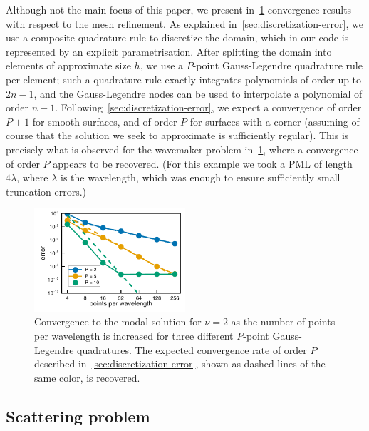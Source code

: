 \documentclass[review,hidelinks,onefignum,onetabnum]{siamart220329}
\begin{document}
Although not the main focus of this paper, we present in~\cref{fig:mesh-convergence} convergence results with respect to the mesh refinement. As explained
in~\cref{sec:discretization-error}, we use a composite quadrature rule to
discretize the domain, which in our code is represented by an explicit
parametrisation. After splitting the domain into elements of approximate size $h$, we use a $P$-point
Gauss-Legendre quadrature rule per element; such a quadrature rule exactly
integrates polynomials of order up to $2n-1$, and the Gauss-Legendre
nodes can be used to interpolate a polynomial of order $n-1$. Following~\cref{sec:discretization-error}, we expect a convergence of order $P+1$ for smooth surfaces, and of order $P$ for surfaces with a corner (assuming of course that the solution we seek to approximate is sufficiently regular). This is precisely what is observed for the wavemaker problem in~\cref{fig:mesh-convergence}, where a convergence of order $P$ appears to be recovered. (For this example we took a PML of length $4 \lambda$, where $\lambda$ is the wavelength, which was enough to ensure sufficiently small truncation errors.)

\begin{figure}
  \centering
  \includegraphics[width=0.5\textwidth]{mesh_convergence_waveguide.pdf}
  \caption{Convergence to the modal solution for $\nu=2$ as the number of
  points per wavelength is increased for three different $P$-point
  Gauss-Legendre quadratures. The expected convergence rate of order $P$
  described in~\cref{sec:discretization-error}, shown as dashed lines of the same color, is recovered.}
  \label{fig:mesh-convergence}
\end{figure}

\subsection{Scattering problem}
\end{document}
